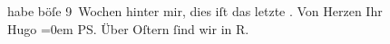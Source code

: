 \begin{ledgroupsized}[t]{13cm}
               habe böſe 9 Wochen hinter mir, dies iſt das letzte \label{K_L02339_2v}\label{K_L02339_2h}.\pend
           \pstart
           Von Herzen Ihr{\\[\baselineskip]}\spacefill\mbox{Hugo}\pend
           \leftskip=0em{}\pstart
           \textsc{PS}. Über Oſtern{ }ſind wir in R.\pend
           \endnumbering{}\end{ledgroupsized}  \newcommand{\dateiname}{L02339}\newcommand{\titel}{Hugo Hofmannsthal an Arthur Schnitzler, 31. 3. 1920}\newcommand{\editorInnen}{Martin Anton Müller und Gerd-Hermann Susen}
            \footnotesize
\begin{ledgroupsized}[t]{11.5cm}
\end{ledgroupsized}
         
      